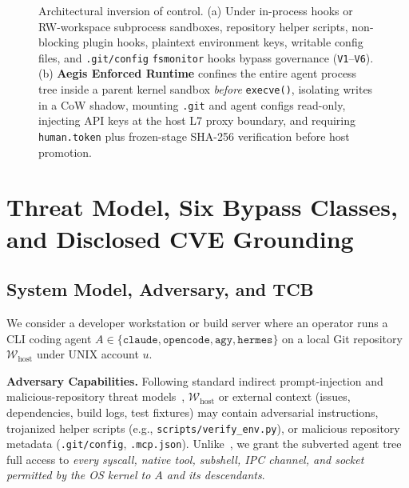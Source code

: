 \documentclass[10pt,journal,compsoc]{IEEEtran}
\begin{document}
\begin{figure}[!t]
{%
}
\vspace{-4pt}
\caption{Architectural inversion of control. (a) Under in-process hooks or RW-workspace subprocess sandboxes, repository helper scripts, non-blocking plugin hooks, plaintext environment keys, writable config files, and \texttt{.git/config} \texttt{fsmonitor} hooks bypass governance (\texttt{V1}--\texttt{V6}). (b) \textbf{Aegis Enforced Runtime} confines the entire agent process tree inside a parent kernel sandbox \emph{before} \texttt{execve()}, isolating writes in a CoW shadow, mounting \texttt{.git} and agent configs read-only, injecting API keys at the host L7 proxy boundary, and requiring \texttt{human.token} plus frozen-stage SHA-256 verification before host promotion.}
\label{fig:inversion}
\end{figure}

\section{Threat Model, Six Bypass Classes, and Disclosed CVE Grounding}
\label{sec:threat}

\subsection{System Model, Adversary, and TCB}

We consider a developer workstation or build server where an operator runs a CLI coding agent $A \in \{\texttt{claude}, \texttt{opencode}, \texttt{agy}, \texttt{hermes}\}$ on a local Git repository $\mathcal{W}_{\text{host}}$ under UNIX account $u$.

\noindent\textbf{Adversary Capabilities.} Following standard indirect prompt-injection and malicious-repository threat models~\cite{greshake2023not,debenedetti2024agentdojo,zhan2024injecagent}, $\mathcal{W}_{\text{host}}$ or external context (issues, dependencies, build logs, test fixtures) may contain adversarial instructions, trojanized helper scripts (e.g., \texttt{scripts/verify\_env.py}), or malicious repository metadata (\texttt{.git/config}, \texttt{.mcp.json}). Unlike~\cite{zhao2026aegisos}, we grant the subverted agent tree full access to \emph{every syscall, native tool, subshell, IPC channel, and socket permitted by the OS kernel to $A$ and its descendants}.
\end{document}
